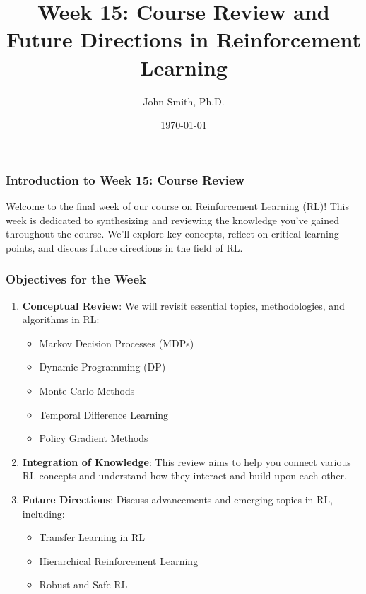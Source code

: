\documentclass[aspectratio=169]{beamer}
\title[Course Review in RL]{Week 15: Course Review and Future Directions in Reinforcement Learning}
\author[J. Smith]{John Smith, Ph.D.}
\institute[University Name]{
  Department of Computer Science\\
  University Name\\
  \vspace{0.3cm}
  Email: email@university.edu\\
  Website: www.university.edu
}
\date{\today}
\begin{document}
\frame{\titlepage}

\begin{frame}[fragile]
    \frametitle{Introduction to Week 15: Course Review}
    Welcome to the final week of our course on Reinforcement Learning (RL)! This week is dedicated to synthesizing and reviewing the knowledge you’ve gained throughout the course. We'll explore key concepts, reflect on critical learning points, and discuss future directions in the field of RL.
\end{frame}

\begin{frame}[fragile]
    \frametitle{Objectives for the Week}
    \begin{enumerate}
        \item \textbf{Conceptual Review}: We will revisit essential topics, methodologies, and algorithms in RL:
        \begin{itemize}
            \item Markov Decision Processes (MDPs)
            \item Dynamic Programming (DP)
            \item Monte Carlo Methods
            \item Temporal Difference Learning
            \item Policy Gradient Methods
        \end{itemize}
        
        \item \textbf{Integration of Knowledge}: This review aims to help you connect various RL concepts and understand how they interact and build upon each other.

        \item \textbf{Future Directions}: Discuss advancements and emerging topics in RL, including:
        \begin{itemize}
            \item Transfer Learning in RL
            \item Hierarchical Reinforcement Learning
            \item Robust and Safe RL
        \end{itemize}
    \end{enumerate}
\end{frame}
\end{document}
